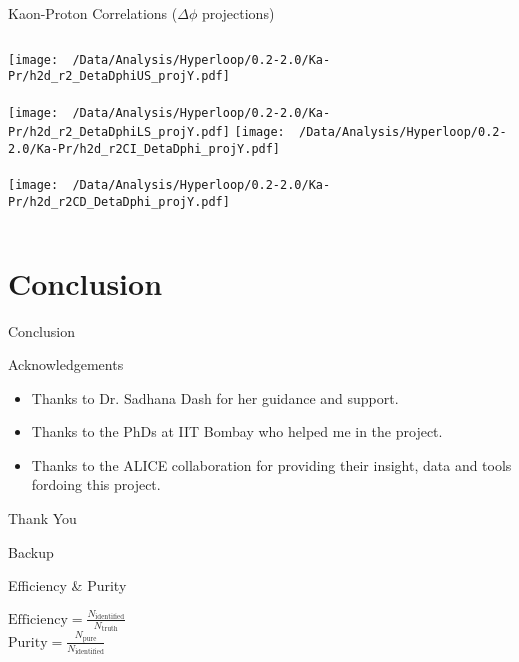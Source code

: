 \documentclass{beamer}
\begin{document}
\begin{frame}{Kaon-Proton Correlations ($\Delta\phi$ projections)}
\begin{columns}
	\centering
	\texttt{[image: ~/Data/Analysis/Hyperloop/0.2-2.0/Ka-Pr/h2d\_r2\_DetaDphiUS\_projY.pdf]}\\~\\
	\texttt{[image: ~/Data/Analysis/Hyperloop/0.2-2.0/Ka-Pr/h2d\_r2\_DetaDphiLS\_projY.pdf]}
	\centering
	\texttt{[image: ~/Data/Analysis/Hyperloop/0.2-2.0/Ka-Pr/h2d\_r2CI\_DetaDphi\_projY.pdf]}\\~\\
	\texttt{[image: ~/Data/Analysis/Hyperloop/0.2-2.0/Ka-Pr/h2d\_r2CD\_DetaDphi\_projY.pdf]}
\end{columns}
\end{frame}
\section{Conclusion}
\begin{frame}{Conclusion}
	
\end{frame}
\begin{frame}{Acknowledgements}
	\begin{itemize}
		\item Thanks to Dr. Sadhana Dash for her guidance and support.
		\item Thanks to the PhDs at IIT Bombay who helped me in the project.
		\item Thanks to the ALICE collaboration for providing their insight, data and tools fordoing this project.
	\end{itemize}
\end{frame}
\begin{frame}
	\centering 
	{\Huge Thank You}
\end{frame}
\begin{frame}
	Backup
\end{frame}
\begin{frame}{Efficiency \& Purity}
	\begin{definition}
		$\mathrm{Efficiency}=\frac{N_{\mathrm{identified}}}{N_{\mathrm{truth}}}$\\
		$\mathrm{Purity}=\frac{N_{\mathrm{pure}}}{N_{\mathrm{identified}}}$
	\end{definition}
\end{frame}
\end{document}
